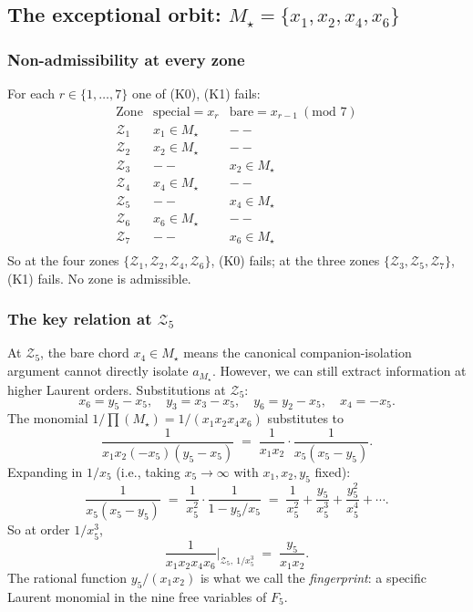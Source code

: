 \documentclass[11pt]{article}
\newcommand{\Zr}{\mathcal{Z}}
\newcommand{\Fr}{F}
\begin{document}
\subsection{The exceptional orbit: $M_\star = \{x_1, x_2, x_4, x_6\}$}

\subsubsection*{Non-admissibility at every zone}

For each $r \in \{1, \ldots, 7\}$ one of (K0), (K1) fails:
\[
\begin{array}{c|c|c}
\text{Zone} & \text{special} = x_r & \text{bare} = x_{r-1}\ (\text{mod } 7) \\ \hline
\Zr_1 & x_1 \in M_\star & --\\
\Zr_2 & x_2 \in M_\star & --\\
\Zr_3 & -- & x_2 \in M_\star\\
\Zr_4 & x_4 \in M_\star & --\\
\Zr_5 & -- & x_4 \in M_\star\\
\Zr_6 & x_6 \in M_\star & --\\
\Zr_7 & -- & x_6 \in M_\star\\
\end{array}
\]
So at the four zones $\{\Zr_1, \Zr_2, \Zr_4, \Zr_6\}$, (K0) fails;
at the three zones $\{\Zr_3, \Zr_5, \Zr_7\}$, (K1) fails. No zone is
admissible.

\subsubsection*{The key relation at $\Zr_5$}

At $\Zr_5$, the bare chord $x_4 \in M_\star$ means the canonical
companion-isolation argument cannot directly isolate $a_{M_\star}$.
However, we can still extract information at higher Laurent orders.
Substitutions at $\Zr_5$:
\[
x_6 = y_5 - x_5,\quad y_3 = x_3 - x_5,\quad y_6 = y_2 - x_5,\quad
x_4 = -x_5.
\]
The monomial $1/\prod(M_\star) = 1/(x_1 x_2 x_4 x_6)$ substitutes to
\[
\frac{1}{x_1 x_2 (-x_5)(y_5 - x_5)}
\;=\; \frac{1}{x_1 x_2}\cdot\frac{1}{x_5(x_5 - y_5)}.
\]
Expanding in $1/x_5$ (i.e., taking $x_5 \to \infty$ with $x_1, x_2, y_5$
fixed):
\[
\frac{1}{x_5(x_5 - y_5)}
\;=\; \frac{1}{x_5^2}\cdot\frac{1}{1 - y_5/x_5}
\;=\; \frac{1}{x_5^2} + \frac{y_5}{x_5^3} + \frac{y_5^2}{x_5^4} + \cdots.
\]
So at order $1/x_5^3$,
\[
\frac{1}{x_1 x_2 x_4 x_6}\bigg|_{\Zr_5,\ 1/x_5^3} \;=\; \frac{y_5}{x_1 x_2}.
\]
The rational function $y_5/(x_1 x_2)$ is what we call the
\emph{fingerprint}: a specific Laurent monomial in the nine free
variables of $\Fr_5$.
\end{document}
